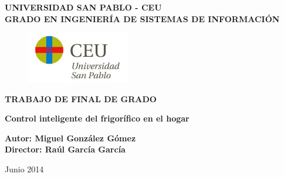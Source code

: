 \begin{titlepage}
\pagestyle{plain} %
\begin{center}
        \Large
        \vspace{1cm}
        \bfseries\textbf{UNIVERSIDAD SAN PABLO - CEU\\}
        \vspace{1cm}
        \large
        \textsf{GRADO EN INGENIERÍA DE SISTEMAS DE INFORMACIÓN\\}
        \vspace{3cm}

        \begin{figure}[htbp]
            \centering
                \includegraphics[width=0.40\textwidth]{CEU_Universidad_San_Pablo.jpg}
            \label{fig:logoceu}
        \end{figure}

        \large
        \vspace*{2cm}
        \bfseries\textbf{TRABAJO DE FINAL DE GRADO\\}

        \Large
        \vspace*{1.5cm}
        \bfseries\textbf{Control inteligente del frigorífico en el hogar}
        \vspace{1cm}

        \large
        \bfseries\textbf{Autor: Miguel González Gómez\\
        Director: Raúl García García}
        \vspace{1.5cm}


        \mdseries\textsf{Junio 2014}
    \end{center}
\end{titlepage}
